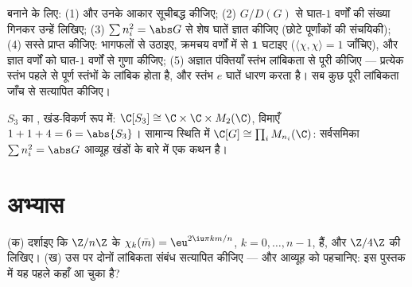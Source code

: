 \begin{method}\label{met:b3:representations:table}
 बनाने के लिए: (1)  और उनके आकार सूचीबद्ध
कीजिए; (2) $G/D(G)$ से घात-$1$ वर्णों की संख्या गिनकर उन्हें
लिखिए; (3) $\sum n_i^2 = \abs G$ से शेष घातें ज्ञात कीजिए (छोटे पूर्णांकों की
संचयिकी); (4) सस्ते  प्राप्त कीजिए: भागफलों से उठाइए,
क्रमचय वर्णों में से $\mathbf 1$ घटाइए ($\langle\chi,\chi\rangle = 1$ जाँचिए), और ज्ञात वर्णों
को घात-$1$ वर्णों से गुणा कीजिए; (5) अज्ञात पंक्तियाँ स्तंभ
लांबिकता से पूरी कीजिए --- प्रत्येक स्तंभ पहले से पूर्ण स्तंभों
के लांबिक होता है, और स्तंभ $e$ घातें धारण करता है। सब कुछ पूरी
लांबिकता जाँच से सत्यापित कीजिए।
\end{method}

\begin{omfigure}

{\small $S_3$ का , खंड-विकर्ण रूप में: $\C[S_3] \cong \C \times \C \times M_2(\C)$, विमाएँ
$1 + 1 +
4 = 6 = \abs{S_3}$। सामान्य स्थिति में $\C[G] \cong \prod_i
M_{n_i}(\C)$: सर्वसमिका $\sum n_i^2 = \abs G$ आव्यूह खंडों के
बारे में एक कथन है।}
\end{omfigure}

\section{अभ्यास}

\begin{exercise}[$\star$]\label{exo:b3:representations:1}
(क) दर्शाइए कि $\Z/n\Z$ के   $\chi_k(\bar m) = \eu^{2\iu\pi km/n}$, $k = 0, \dots, n-1$, हैं, और $\Z/4\Z$
की  लिखिए।
(ख) उस पर दोनों लांबिकता संबंध सत्यापित कीजिए --- और आव्यूह को
पहचानिए: इस पुस्तक में यह पहले कहाँ आ चुका है?
\end{exercise}

